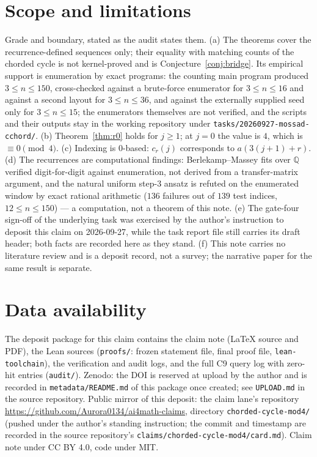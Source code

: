 \documentclass[11pt]{article}
\theoremstyle{definition}
\begin{document}
\section{Scope and limitations}

Grade and boundary, stated as the audit states them. (a) The theorems cover the
recurrence-defined sequences only; their equality with matching counts of the
chorded cycle is not kernel-proved and is Conjecture~\ref{conj:bridge}. Its
empirical support is enumeration by exact programs: the counting main program
produced $3\le n\le 150$, cross-checked against a brute-force enumerator for
$3\le n\le 16$ and against a second layout for $3\le n\le 36$, and against the
externally supplied seed only for $3\le n\le 15$; the enumerators themselves are
not verified, and the scripts and their outputs stay in the working repository
under \texttt{tasks/20260927-mossad-cchord/}. (b)
Theorem~\ref{thm:r0} holds for $j\ge 1$; at $j=0$ the value is $4$, which is
$\equiv 0\pmod 4$. (c) Indexing is $0$-based: $c_r(j)$ corresponds to
$a(3(j+1)+r)$. (d) The recurrences are computational findings: Berlekamp--Massey
fits over $\mathbb{Q}$ verified digit-for-digit against enumeration, not
derived from a transfer-matrix argument, and the natural uniform step-$3$
ansatz is refuted on the enumerated window by exact rational arithmetic ($136$
failures out of $139$ test indices, $12\le n\le 150$) --- a computation, not a
theorem of this note. (e) The gate-four sign-off of the underlying task was
exercised by the author's instruction to deposit this claim on 2026-09-27, while
the task report file still carries its draft header; both facts are recorded
here as they stand. (f) This note carries no literature review and is a deposit
record, not a survey; the narrative paper for the same result is separate.

\section*{Data availability}

The deposit package for this claim contains the claim note (LaTeX source and
PDF), the Lean sources (\texttt{proofs/}: frozen statement file, final proof
file, \texttt{lean-toolchain}), the verification and audit logs, and the full
C9 query log with zero-hit entries (\texttt{audit/}). Zenodo: the DOI is
reserved at upload by the author and is recorded in \texttt{metadata/README.md}
of this package once created; see \texttt{UPLOAD.md} in the source repository.
Public mirror of this deposit: the claim lane's repository
\url{https://github.com/Aurora0134/ai4math-claims}, directory
\texttt{chorded-cycle-mod4/} (pushed under the author's standing instruction;
the commit and timestamp are recorded in the source repository's
\texttt{claims/chorded-cycle-mod4/card.md}).
Claim note under CC BY 4.0, code under MIT.
\end{document}
